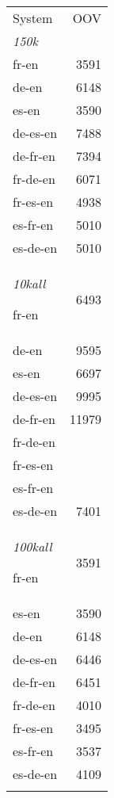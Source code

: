 \begin{tabular}{lr} \toprule
System & OOV \\
\emph{150k} \\
\cmidrule(r){1-2}
\toprule

	fr-en & 3591 \\
	de-en & 6148 \\
	es-en & 3590 \\	
	de-es-en & 7488 \\
	de-fr-en & 7394 \\
	fr-de-en & 6071 \\
	fr-es-en & 4938 \\
	es-fr-en & 5010 \\
	es-de-en & 5010\\
\toprule
\emph{10kall}
\cmidrule(r){1-2}
fr-en & 6493 \\
de-en & 9595 \\
es-en & 6697 \\
de-es-en & 9995 \\ 
de-fr-en & 11979 \\
fr-de-en & \\
fr-es-en & \\
es-fr-en & \\
es-de-en & 7401 \\
\toprule
\emph{100kall}
\cmidrule(r){1-2}
fr-en & 3591\\
es-en & 3590\\
de-en & 6148\\
de-es-en & 6446\\
de-fr-en & 6451\\
fr-de-en & 4010\\
fr-es-en & 3495\\
es-fr-en & 3537\\
es-de-en & 4109\\
\bottomrule
\small
\centering
\label{table:eparloov}
\end{tabular}